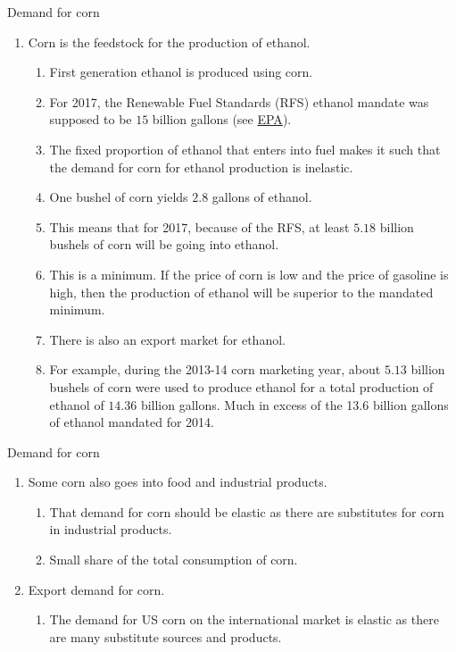 \documentclass[table,xcolor=pdftex,dvipsnames, handout]{beamer}\usepackage[]{graphicx}\usepackage[]{color}
\begin{document}
\begin{frame}[allowframebreaks]{Demand for corn}
\begin{enumerate}[label=\textbullet]
  \item Corn is the feedstock for the production of ethanol.
    \begin{enumerate}[label=-]
         \item First generation ethanol is produced using corn.
         \item For 2017, the Renewable Fuel Standards (RFS) ethanol mandate was supposed to be $15$ billion gallons (see  \href{https://www.epa.gov/renewable-fuel-standard-program/proposed-renewable-fuel-standards-2017-and-biomass-based-diesel}{EPA}).
         \item The fixed proportion of ethanol that enters into fuel makes it such that the demand for corn for ethanol production is inelastic.
         \item One bushel of corn yields $2.8$ gallons of ethanol.
         \item This means that for 2017, because of the RFS, at least $5.18$ billion bushels of corn will be going into ethanol.
         \item This is a minimum. If the price of corn is low and the price of gasoline is high, then the production of ethanol will be superior to the mandated minimum. 
         \item There is also an export market for ethanol.
         \item For example, during the 2013-14 corn marketing year, about $5.13$ billion bushels of corn were used to produce ethanol for a total production of ethanol of $14.36$ billion gallons. Much in excess of the 13.6 billion gallons of ethanol mandated for 2014.
    \end{enumerate}
\end{enumerate}
\end{frame}


\begin{frame}{Demand for corn}
\begin{enumerate}[label=\textbullet]
  \item Some corn also goes into food and industrial products.
      \begin{enumerate}[label=-]
         \item That demand for corn should be elastic as there are substitutes for corn in industrial products.
         \item Small share of the total consumption of corn.
      \end{enumerate}
  \item Export demand for corn.
      \begin{enumerate}[label=-]
         \item The demand for US corn on the international market is elastic as there are many substitute sources and products.
      \end{enumerate}
\end{enumerate}
\end{frame}
\end{document}
